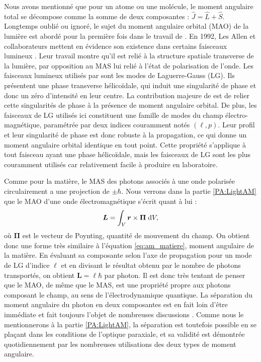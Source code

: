 Nous avons mentionné que pour un atome ou une molécule, le moment angulaire total se décompose comme la somme de deux composantes : $\hat{J} = \hat{L}+\hat{S}$. Longtemps oublié ou ignoré, le sujet du moment angulaire orbital (MAO) de la lumière est abordé pour la première fois dans le travail de . En 1992, Les Allen et collaborateurs mettent en évidence son existence dans certains faisceaux lumineux . Leur travail montre qu'il est relié à la structure spatiale transverse de la lumière, par opposition au MAS lui relié à l'état de polarisation de l'onde. Les faisceaux lumineux utilisés par  sont les modes de Laguerre-Gauss (LG). Ils présentent une phase transverse hélicoïdale, qui induit une singularité de phase et donc un zéro d'intensité en leur centre. La contribution majeure de  est de relier cette singularités de phase à la présence de moment angulaire orbital. De plus, les faisceaux de LG utilisés ici constituent une famille de modes du champ électro-magnétique, paramétrée par deux indices couramment notés $(\ell,p)$. Leur profil et leur singularité de phase est donc robuste à la propagation, ce qui donne un moment angulaire orbital identique en tout point. Cette propriété s'applique à tout faisceau ayant une phase hélicoïdale, mais les faisceaux de LG sont les plus couramment utilisés car relativement facile à produire en laboratoire. 

Comme pour la matière, le MAS des photons associés à une onde polarisée circulairement a une projection de $\pm \hbar$. Nous verrons dans la partie \ref{PA:LightAM} que le MAO d'une onde électromagnétique s'écrit quant à lui :
\begin{equation}
\bm{L} = \int_V \bm{r}\times\bm{\Pi}\;\mathrm{d} V,
\end{equation}
où $\bm{\Pi}$ est le vecteur de Poynting, quantité de mouvement du champ. On obtient donc une forme très similaire à l'équation \ref{eq:am_matiere}, moment angulaire de la matière. En évaluant sa composante selon l'axe de propagation pour un mode de LG d'indice $\ell$ et en divisant le résultat obtenu par le nombre de photons transportés, on obtient $\bm{L}=\ell\hbar$ par photon. Il est donc très tentant de penser que le MAO, de même que le MAS, est une propriété propre aux photons composant le champ, au sens de l'électrodynamique quantique. La séparation du moment angulaire du photon en deux composantes est en fait loin d'être immédiate  et fait toujours l'objet de nombreuses discussions . Comme nous le mentionnerons à la partie \ref{PA:LightAM}, la séparation est toutefois possible en se plaçant dans les conditions de l'optique paraxiale, et sa validité est démontrée quotidiennement par les nombreuses utilisations des deux types de moment angulaire.

